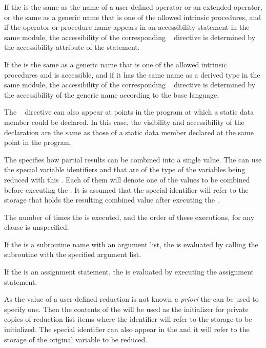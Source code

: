 {{{{\fortranspecificstart
If the  is the same as the name of a user-defined operator or an extended operator, or the same as a generic name that is one of the allowed intrinsic procedures, and if the operator or procedure name appears in an accessibility statement in the same module, the accessibility of the corresponding ~ directive is determined by the accessibility attribute of the statement.

If the  is the same as a generic name that is one of the allowed intrinsic procedures and is accessible, and if it has the same name as a derived type in the same module, the accessibility of the corresponding ~ directive is determined by the accessibility of the generic name according to the base language.
\fortranspecificend

\cppspecificstart
The ~ directive can also appear at points in the program at which 
a static data member could be declared. In this case, the visibility and accessibility of 
the declaration are the same as those of a static data member declared at the same point 
in the program.
\cppspecificend

The  specifies how partial results can be combined into a single value. The 
 can use the special variable identifiers  and  that are of the 
type of the variables being reduced with this . Each of them will 
denote one of the values to be combined before executing the . It is assumed 
that the special  identifier will refer to the storage that holds the resulting 
combined value after executing the .

The number of times the  is executed, and the order of these executions, for 
any  clause is unspecified.

\fortranspecificstart
If the  is a subroutine name with an argument list, the  is evaluated by 
calling the subroutine with the specified argument list.

If the  is an assignment statement, the  is evaluated by executing the 
assignment statement.
\fortranspecificend

As the  value of a user-defined reduction is not known \emph{a priori} the 
 can be used to specify one. Then the contents of the  
will be used as the initializer for private copies of reduction list items where the 
 identifier will refer to the storage to be initialized. The special identifier 
 can also appear in the  and it will refer to the storage of the 
original variable to be reduced.

}}}}

